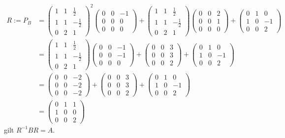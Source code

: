 \documentclass[../../main.tex]{subfiles}
\begin{document}
\begin{bsp}
\begin{align*}
R:=P_B&=\begin{pmatrix}1&1&\frac{1}{2}\\1&1&-\frac{1}{2}\\0&2&1\end{pmatrix}^2\begin{pmatrix}0&0&-1\\0&0&0\\0&0&0\end{pmatrix}+\begin{pmatrix}1&1&\frac{1}{2}\\1&1&-\frac{1}{2}\\0&2&1\end{pmatrix}\begin{pmatrix}0&0&2\\0&0&1\\0&0&0\end{pmatrix}+\begin{pmatrix}0&1&0\\1&0&-1\\0&0&2\end{pmatrix}\\
&=\begin{pmatrix}1&1&\frac{1}{2}\\1&1&-\frac{1}{2}\\0&2&1\end{pmatrix}\begin{pmatrix}0&0&-1\\0&0&-1\\0&0&0\end{pmatrix}+\begin{pmatrix}0&0&3\\0&0&3\\0&0&2\end{pmatrix}+\begin{pmatrix}0&1&0\\1&0&-1\\0&0&2\end{pmatrix}\\
&=\begin{pmatrix}0&0&-2\\0&0&-2\\0&0&-2\end{pmatrix}+\begin{pmatrix}0&0&3\\0&0&3\\0&0&2\end{pmatrix}+\begin{pmatrix}0&1&0\\1&0&-1\\0&0&2\end{pmatrix}\\
&=\begin{pmatrix}0&1&1\\1&0&0\\0&0&2\end{pmatrix}
\end{align*}
gilt $R^{-1}BR=A$.
\end{bsp}
\end{document}
